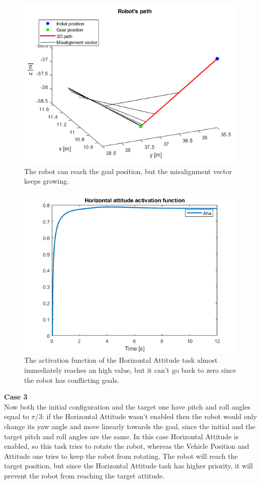 \documentclass{article}
\begin{document}
\begin{figure}[H]
	\centering
	\includegraphics[width=0.7\linewidth]{images/Ex1/HorAtt_Enabled_SameStartpos_DifferentEndpos_Path}
	\caption{The robot can reach the goal position, but the misalignment vector keeps growing.}
	\label{fig:q2case2c}
\end{figure}
\begin{figure}[H]
	\centering
	\includegraphics[width=0.7\linewidth]{images/Ex1/HorAtt_Enabled_SameStartpos_DifferentEndpos_ActivFunct}
	\caption{The activation function of the Horizontal Attitude task almost immediately reaches an high value, but it can't go back to zero since the robot has conflicting goals.}
	\label{fig:q2case2d}
\end{figure}

{\large \textbf{Case 3}} \\
Now both the initial configuration and the target one have pitch and roll angles equal to $ \pi/3 $: if the Horizontal Attitude wasn't enabled then the robot would only change its yaw angle and move linearly towards the goal, since the initial and the target pitch and roll angles are the same. In this case Horizontal Attitude is enabled, so this task tries to rotate the robot, whereas the Vehicle Position and Attitude one tries to keep the robot from rotating. The robot will reach the target position, but since the Horizontal Attitude task has higher priority, it will prevent the robot from reaching the target attitude.
\end{document}
